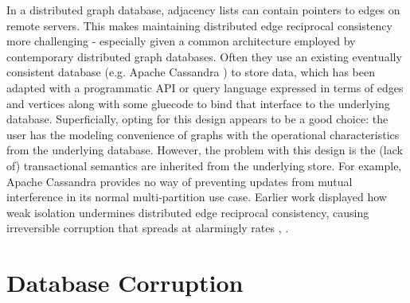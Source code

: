 \documentclass[sigplan,10pt]{acmart}
\begin{document}
In a distributed graph database, adjacency lists can contain pointers to edges on remote servers. This makes maintaining distributed edge reciprocal consistency more challenging - especially given a common architecture employed by contemporary distributed graph databases. Often they use an existing eventually consistent database (e.g. Apache Cassandra \cite{Cassandra}) to store data, which has been adapted with a programmatic API or query language expressed in terms of edges and vertices along with some gluecode to bind that interface to the underlying database. Superficially, opting for this design appears to be a good choice: the user has the modeling convenience of graphs with the operational characteristics from the underlying database. However, the problem with this design is the (lack of) transactional semantics are inherited from the underlying store. For example, Apache Cassandra provides no way of preventing updates from mutual interference in its normal multi-partition use case. Earlier work displayed how weak isolation undermines distributed edge reciprocal consistency, causing irreversible corruption that spreads at alarmingly rates \cite{Ezhilchelvan2018}, \cite{Webber2019}.

\section{Database Corruption}
\label{sec:db-corruption}
\end{document}
